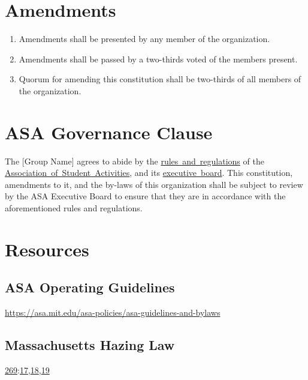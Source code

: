 \documentclass[12pt]{article}
\def\groupname{[Group Name]\xspace}
\begin{document}
\section{Amendments}
\begin{enumerate}
    \item Amendments shall be presented by any member of the organization.

    \item Amendments shall be passed by a two-thirds voted of the members present.

    \item Quorum for amending this constitution shall be two-thirds of all members of the organization.
\end{enumerate}

\section{ASA Governance Clause}
The \groupname agrees to abide by the \href{https://asa.mit.edu/asa-policies}{rules~and~regulations} of the \href{https://asa.mit.edu/}{Association~of~Student~Activities}, and its \href{https://asa.mit.edu/about-asa/board-members}{executive~board}.
This constitution, amendments to it, and the by-laws of this organization shall be subject to review by the ASA Executive Board to ensure that they are in accordance with the aforementioned rules and regulations.

\section{Resources}
\subsection{ASA Operating Guidelines}
\url{https://asa.mit.edu/asa-policies/asa-guidelines-and-bylaws}

\subsection{Massachusetts Hazing Law}
\href{https://malegislature.gov/Laws/GeneralLaws/PartIV/TitleI/Chapter269}{269}:\href{https://malegislature.gov/Laws/GeneralLaws/PartIV/TitleI/Chapter269/Section17}{17},\href{https://malegislature.gov/Laws/GeneralLaws/PartIV/TitleI/Chapter269/Section18}{18},\href{https://malegislature.gov/Laws/GeneralLaws/PartIV/TitleI/Chapter269/Section19}{19}
\end{document}
